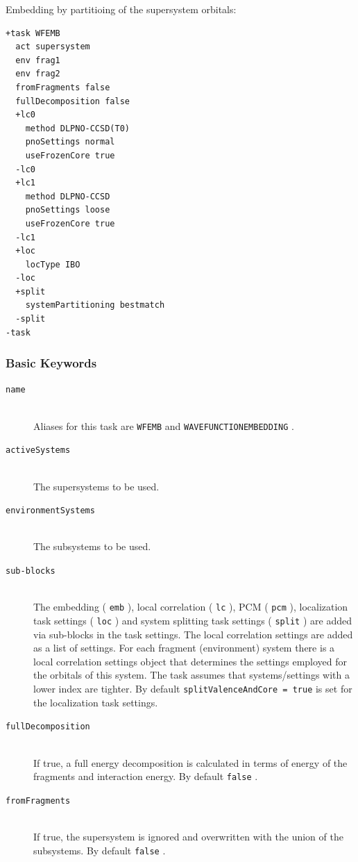 \documentclass[bibliography=totocnumbered,a4paper,10pt,oneside]{scrbook}
\newcommand{\ttt}[1]{%
  \begingroup\setlength{\fboxsep}{1pt}%
  \colorbox{serenity-green!30}{\texttt{\hspace*{2pt}\vphantom{(g}#1\hspace*{2pt}}}%
  \endgroup
}
\begin{document}
Embedding by partitioing of the supersystem orbitals:
\begin{lstlisting}
+task WFEMB
  act supersystem
  env frag1
  env frag2
  fromFragments false
  fullDecomposition false
  +lc0
    method DLPNO-CCSD(T0)
    pnoSettings normal
    useFrozenCore true
  -lc0
  +lc1
    method DLPNO-CCSD
    pnoSettings loose
    useFrozenCore true
  -lc1
  +loc
    locType IBO
  -loc
  +split
    systemPartitioning bestmatch
  -split
-task
\end{lstlisting}

\subsubsection{Basic Keywords}
\begin{description}
    \item [\texttt{name}]\hfill \\
    Aliases for this task are \ttt{WFEMB} and \ttt{WAVEFUNCTIONEMBEDDING}.
	\item[\texttt{activeSystems}]\hfill \\
	The supersystems to be used.
	\item[\texttt{environmentSystems}]\hfill \\
	The subsystems to be used.
    \item [\texttt{sub-blocks}]\hfill \\
    The embedding (\ttt{emb}), local correlation (\ttt{lc}), PCM (\ttt{pcm}), localization task settings (\ttt{loc}) and
    system splitting task settings (\ttt{split}) are added via sub-blocks in the task settings.
    The local correlation settings are added as a list of settings. For each fragment (environment) system there is
    a local correlation settings object that determines the settings employed for the orbitals of this system. The
    task assumes that systems/settings with a lower index are tighter.
    By default \ttt{splitValenceAndCore = true} is set for the localization task settings.
    \item [\texttt{fullDecomposition}]\hfill \\
    If true, a full energy decomposition is calculated in terms of energy of the fragments and interaction energy.
    By default \ttt{false}.
    \item [\texttt{fromFragments}]\hfill \\
    If true, the supersystem is ignored and overwritten with the union of the subsystems. By default \ttt{false}.
\end{description}
\end{document}
